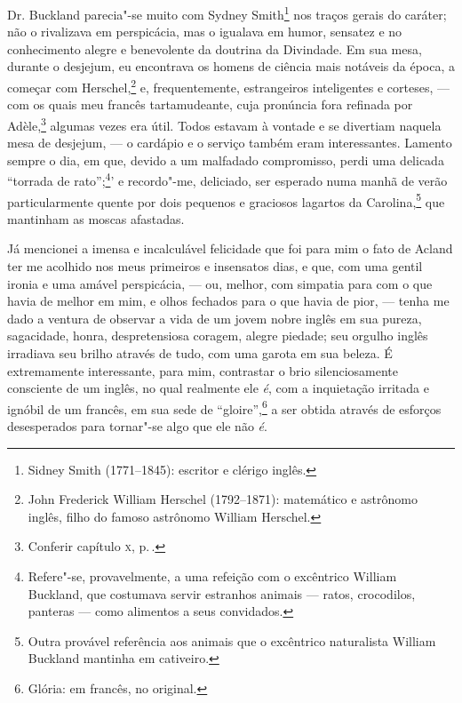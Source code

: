 Dr. Buckland parecia"-se muito com Sydney Smith\footnote{Sidney Smith
  (1771--1845): escritor e clérigo inglês.} nos traços
gerais do caráter; não o rivalizava em perspicácia, mas o igualava em
humor, sensatez e no conhecimento alegre e benevolente da doutrina da
Divindade. Em sua mesa, durante o desjejum, eu encontrava os homens de
ciência mais notáveis da época, a começar com Herschel,\footnote{John
  Frederick William Herschel (1792--1871): matemático e astrônomo inglês,
  filho do famoso astrônomo William Herschel.} e,
frequentemente, estrangeiros inteligentes e corteses, --- com os quais
meu francês tartamudeante, cuja pronúncia fora refinada por
Adèle,\footnote{Conferir capítulo \textsc{x}, p.\,\pageref{207}.} algumas
vezes era útil. Todos estavam à vontade e se divertiam naquela mesa de
desjejum, --- o cardápio e o serviço também eram interessantes. Lamento
sempre o dia, em que, devido a um malfadado compromisso, perdi uma
delicada ``torrada de rato'';\footnote{Refere"-se, provavelmente, a uma
  refeição com o excêntrico William Buckland, que costumava servir
  estranhos animais --- ratos, crocodilos, panteras --- como alimentos a
  seus convidados.}' e recordo"-me, deliciado, ser
esperado numa manhã de verão particularmente quente por dois pequenos e
graciosos lagartos da Carolina,\footnote{Outra provável referência aos
  animais que o excêntrico naturalista William Buckland mantinha em
  cativeiro.} que mantinham as moscas afastadas.

Já mencionei a imensa e incalculável felicidade que foi para mim o
fato de Acland ter me acolhido nos meus primeiros e insensatos dias, e
que, com uma gentil ironia e uma amável perspicácia, --- ou, melhor, com
simpatia para com o que havia de melhor em mim, e olhos fechados para o
que havia de pior, --- tenha me dado a ventura de observar a vida de um
jovem nobre inglês em sua pureza, sagacidade, honra, despretensiosa
coragem, alegre piedade; seu orgulho inglês irradiava seu brilho através
de tudo, com uma garota em sua beleza. É extremamente interessante, para
mim, contrastar o brio silenciosamente consciente de um inglês, no qual
realmente ele \textit{é}, com a inquietação irritada e ignóbil de um
francês, em sua sede de ``gloire'',\footnote{Glória: em francês, no
  original.} a ser obtida através de esforços
desesperados para tornar"-se algo que ele não \textit{é}.

